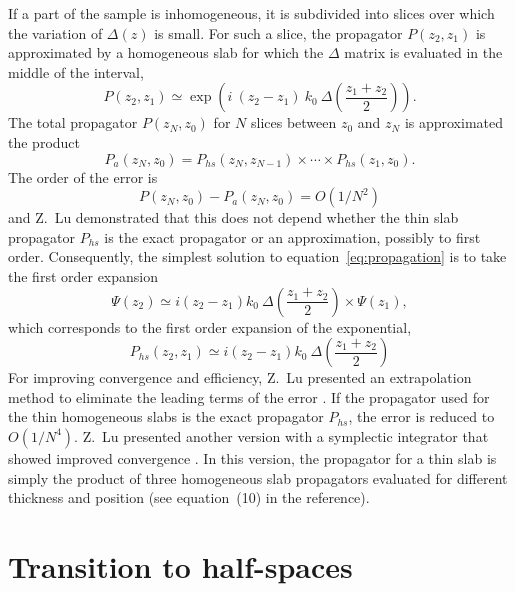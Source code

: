 If a part of the sample is inhomogeneous, it is subdivided into slices over which the variation of $\Delta(z)$ is small. 
For such a slice, the propagator $P(z_2,z_1)$ is approximated by a homogeneous slab for which the $\Delta$ matrix is evaluated in the middle of the interval,
$$
P(z_2,z_1) \simeq 
\exp\left(i\ (z_2-z_1)\ k_0\ \Delta\left(\frac{z_1+z_2}{2}\right)\right).
$$
The total propagator $P(z_N,z_0)$ for $N$ slices between $z_0$ and $z_N$ is approximated the product
$$P_a(z_N,z_0) = P_{hs}(z_N, z_{N-1})\times \cdots  \times P_{hs}(z_1,z_0).$$
The order of the error is
$$P(z_N,z_0)-P_a(z_N,z_0) = O(1/N^2)$$
and  Z.~Lu demonstrated \cite{2007_Lu} that this does not depend whether the thin slab propagator $P_{hs}$ is the exact propagator or an approximation, possibly to first order.
Consequently, the simplest solution to equation~\ref{eq:propagation} is to take the first order expansion
$$
\Psi(z_2) \simeq 
i (z_2-z_1) k_0\ \Delta\left(\frac{z_1+z_2}{2}\right)\times \Psi(z_1),
$$
which corresponds to the first order expansion of the exponential,
$$
P_{hs}(z_2,z_1) \simeq i (z_2-z_1) k_0\ \Delta\left(\frac{z_1+z_2}{2}\right)
$$
For improving convergence and efficiency, Z.~Lu presented an extrapolation method to eliminate the leading terms of the error \cite{2007_Lu}.
If the propagator used for the thin homogeneous slabs is the exact propagator $P_{hs}$, the error is reduced to $O(1/N^4)$.
Z.~Lu presented another version with a symplectic integrator that showed improved convergence \cite{2010_Lu}.
In this version, the propagator for a thin slab is simply the product of three homogeneous slab propagators evaluated for different thickness and position (see equation~(10) in the reference).

\section{Transition to half-spaces}

